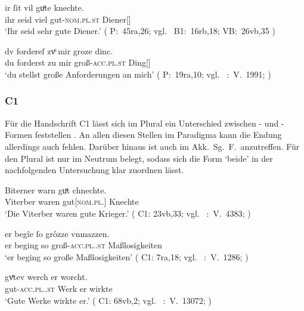 \begin{exe}
\ex \label{ex:kcpregel}
	\begin{xlist}
	\ex \label{ex:kcpregel_1}
		\gll ir ſit vil guͦte knechte. \\
			ihr seid viel gut-\textsc{nom.pl.st} Diener[\MascM] \\
		\trans `Ihr seid sehr gute Diener.'
			(%
				P:~45ra,26; vgl.~%
				B1:~16rb,18;
				VB:~26vb,35%
			)

	\ex \label{ex:kcpregel_2}
		\gll dv fordereſ zvͦ mir groze dinc. \\
			du forderst zu mir groß-\textsc{acc.pl.st} Ding[\NeutI] \\
		\trans `du stellst große Anforderungen an mich'
			(%
				P:~19ra,10; vgl.~%
				\KC:~V.~1991;
				\cite[118]{schroeder1895}%
			)
	\end{xlist}
\end{exe}

\subsubsection{C1}
Für die Handschrift C1 lässt sich im Plural ein Unterschied zwischen
- und -Formen feststellen . An allen diesen
Stellen im Paradigma kann die Endung allerdings auch fehlen. Darüber hinaus ist
 auch im Akk.\ Sg.\ F.\ anzutreffen. Für den Plural ist 
nur im Neutrum belegt, sodass sich die Form  `beide' in der
nachfolgenden Untersuchung klar zuordnen lässt.

\begin{exe}
\ex \label{ex:kcc1regel}
	\begin{xlist}
	\ex \label{ex:kcc1regel_1}
		\gll Biterner warn guͤt chnechte. \\
			Viterber waren gut[\textsc{nom.pl.\MascM}] Knechte \\
		\trans `Die Viterber waren gute Krieger.'
			(%
				C1: 23vb,33; vgl.~%
				\KC:~V.~4383;
				\cite[161]{schroeder1895}%
			)

	\ex \label{ex:kcc1regel_2}
		\gll er begîe ſo grôzze vnmazzen. \\
			er beging so groß-\textsc{acc.pl.\FemI.st} Maßlosigkeiten \\
		\trans `er beging so große Maßlosigkeiten'
			(%
				C1: 7ra,18; vgl.~%
				\KC:~V.~1286;
				\cite[105]{schroeder1895}%
			)

	\ex \label{ex:kcc1regel_3}
		\gll gvͤtev werch er worcht. \\
			gut-\textsc{acc.pl.\NeutI.st} Werk er wirkte \\
		\trans `Gute Werke wirkte er.'
			(%
				C1: 68vb,2; vgl.~%
				\KC:~V.~13072;
				\cite[318]{schroeder1895}%
			)
	\end{xlist}
\end{exe}

